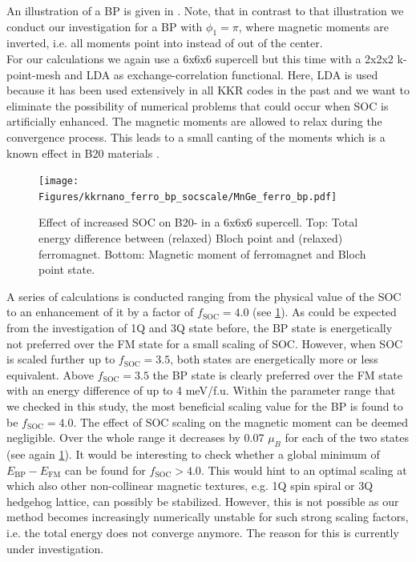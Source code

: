 \documentclass[graybox]{svmult}
\begin{document}
An illustration of a BP is given in . Note, that in contrast to
that illustration we conduct our investigation for a BP with $\phi_{1}=\pi$, where magnetic moments
are inverted, i.e. all moments point into instead of out of the center.
\\
For our calculations we
again use a 6x6x6 supercell but this time with a 2x2x2 k-point-mesh and LDA as
exchange-correlation functional. Here, LDA is used because it has been used extensively in all KKR codes
in the past and 
we want to eliminate the possibility of numerical problems that could occur when SOC is artificially enhanced.
The magnetic moments are allowed to relax during the convergence process.
This leads to a small canting of the moments which is a known effect in
B20 materials \cite{chizhikov_multishell_2013}.
\begin{figure}[!htb]
  \centering
   \texttt{[image: Figures/kkrnano\_ferro\_bp\_socscale/MnGe\_ferro\_bp.pdf]}
	\caption{Effect of increased SOC on B20- in a 6x6x6 supercell.
	Top: Total energy difference between (relaxed) Bloch point and (relaxed) ferromagnet.
	Bottom: Magnetic moment of ferromagnet and Bloch point state.}
\label{fig:MnGe_kkrnano_comparison_bp}
\end{figure}
A series of calculations is conducted ranging from the physical value of the SOC 
to
an enhancement of it by a
factor of $f_{\text{SOC}}=4.0$ (see \cref{fig:MnGe_kkrnano_comparison_bp}).
As could be expected from the investigation of 1Q and 3Q state before,
the BP state is energetically not preferred over the FM state for a small
scaling of SOC.
However, when SOC is scaled further up to $f_{\text{SOC}}=3.5$,
both states are energetically more or less equivalent.
Above $f_{\text{SOC}}=3.5$ the BP state is clearly preferred over the FM state with
an energy difference of up to 4 meV/f.u.
Within the parameter range that we checked in this study,
the most beneficial scaling value for the BP is found to be $f_{\text{SOC}}=4.0$.
The effect of SOC scaling on the magnetic moment can be deemed negligible. Over the whole
range it decreases by 0.07 $\mu_{B}$ for each of the two states
(see again \cref{fig:MnGe_kkrnano_comparison_bp}).
It would be interesting to check whether a global minimum of $E_{\text{BP}}-E_{\text{FM}}$ can
be found for $f_{\text{SOC}} > 4.0$. This would hint to an optimal
scaling at which also other non-collinear magnetic textures, e.g. 1Q spin spiral or
3Q hedgehog lattice, can possibly be stabilized.
However, this is not possible as our method becomes increasingly numerically unstable for 
such strong scaling factors, i.e. the total energy does not converge anymore.
The reason for this is currently under investigation.
\end{document}
